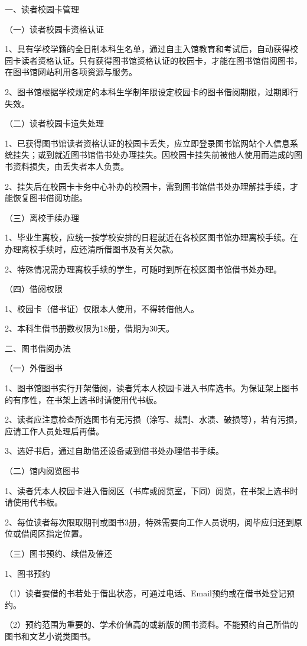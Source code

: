 \documentclass[UTF8,12pt,a4paper]{report}
\begin{document}
一、读者校园卡管理

（一）读者校园卡资格认证

1、具有学校学籍的全日制本科生名单，通过自主入馆教育和考试后，自动获得校园卡读者资格认证。只有获得图书馆资格认证的校园卡，才能在图书馆借阅图书，在图书馆网站利用各项资源与服务。

2、图书馆根据学校规定的本科生学制年限设定校园卡的图书借阅期限，过期即行失效。

（二）读者校园卡遗失处理

1、已获得图书馆读者资格认证的校园卡丢失，应立即登录图书馆网站个人信息系统挂失；或到就近图书馆借书处办理挂失。因校园卡挂失前被他人使用而造成的图书资料损失，由丢失者本人负责。

2、挂失后在校园卡卡务中心补办的校园卡，需到图书馆借书处办理解挂手续，才能恢复图书借阅功能。

（三）离校手续办理

1、毕业生离校，应统一按学校安排的日程就近在各校区图书馆办理离校手续。在办理离校手续时，应还清所借图书及有关欠款。

2、特殊情况需办理离校手续的学生，可随时到所在校区图书馆借书处办理。

（四）借阅权限

1、校园卡（借书证）仅限本人使用，不得转借他人。

2、本科生借书册数权限为18册，借期为30天。

二、图书借阅办法

（一）外借图书

1、图书馆图书实行开架借阅，读者凭本人校园卡进入书库选书。为保证架上图书的有序性，在书架上选书时请使用代书板。

2、读者应注意检查所选图书有无污损（涂写、裁割、水渍、破损等），若有污损，应请工作人员处理后再借。

3、选好书后，通过自助借还设备或到借书处办理借书手续。

（二）馆内阅览图书

1、读者凭本人校园卡进入借阅区（书库或阅览室，下同）阅览，在书架上选书时请使用代书板。

2、每位读者每次限取期刊或图书3册，特殊需要向工作人员说明，阅毕应归还到原位或借阅区指定位置。

（三）图书预约、续借及催还

1、图书预约

（1）读者要借的书若处于借出状态，可通过电话、Email预约或在借书处登记预约。

（2）预约范围为重要的、学术价值高的或新版的图书资料。不能预约自己所借的图书和文艺小说类图书。
\end{document}
